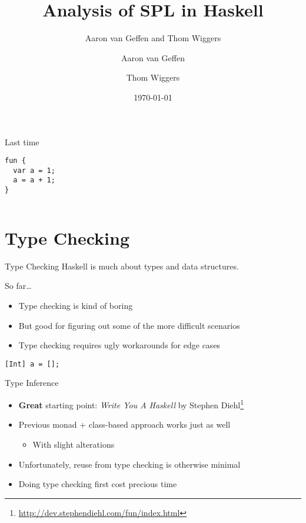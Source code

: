 \documentclass[department=icis, slidenumbers=slide, official=true]{beamerruhuisstijl}
\title{Analysis of SPL in Haskell}
\subtitle{Aaron van Geffen and Thom Wiggers}
\date{\today}
\author{Aaron van Geffen \and Thom Wiggers}
\begin{document}
\begin{frame}
    \titlepage{}
\end{frame}

%
%
%
%


\begin{frame}[fragile]{Last time}
\begin{verbatim}
fun {
  var a = 1;
  a = a + 1;
}
\end{verbatim}
\pause{}

\inputminted{Haskell}{ex1.hs}
\end{frame}

\section{Type Checking}
\begin{frame}[fragile]{Type Checking}
    Haskell is much about types and data structures.
    


\end{frame}

\begin{frame}[fragile]{So far\ldots}
    \begin{itemize}
        \item Type checking is kind of boring
        \item But good for figuring out some of the more difficult scenarios
        \item Type checking requires ugly workarounds for edge cases
    \end{itemize}

\begin{verbatim}
[Int] a = [];
\end{verbatim}
\end{frame}

\begin{frame}{Type Inference}
    \begin{itemize}[<+->]
        \item \textbf{Great} starting point: \emph{Write You A Haskell} by Stephen Diehl\footnote{\url{http://dev.stephendiehl.com/fun/index.html}}
        \item Previous monad + class-based approach works just as well
            \begin{itemize}
                \item<1-> With slight alterations
            \end{itemize}
        \item Unfortunately, reuse from type checking is otherwise minimal
        \item Doing type checking first cost precious time
    \end{itemize}
\end{frame}
\end{document}

